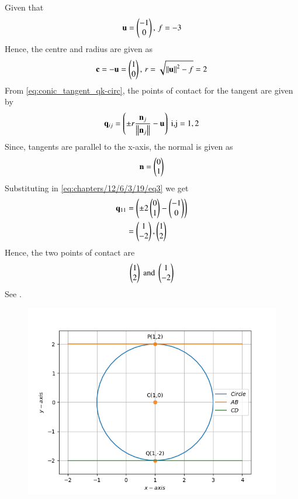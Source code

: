 Given that 
\begin{align}
	\mathbf{u} = \begin{pmatrix}-1\\0\end{pmatrix},\,
	f = -3
\end{align}
Hence, the centre and radius are given as
\begin{align}
	\mathbf{c} = -\mathbf{u} = \begin{pmatrix}1\\0\end{pmatrix},\,
	r = \sqrt{\left\lVert\mathbf{u}\right\rVert^2 - f}
	  = 2
\end{align}
From \eqref{eq:conic_tangent_qk-circ},
the points of contact for the tangent are given by
\begin{align}
	\label{eq:chapters/12/6/3/19/eq3}
	\mathbf{q}_{ij} = \left(\pm r\frac{\mathbf{n}_j}{\left\lVert\mathbf{n}_j\right\rVert}-\mathbf{u}\right) \text{ i,j} = 1,2
\end{align}
Since, tangents are parallel to the x-axis, the normal is given as
\begin{align}
	\mathbf{n} = \begin{pmatrix}0\\1\end{pmatrix}
\end{align}
Substituting in \eqref{eq:chapters/12/6/3/19/eq3} we get
\begin{align}
	\mathbf{q}_{11} &= \left(\pm 2\begin{pmatrix}0\\1\end{pmatrix} - \begin{pmatrix}-1\\0\end{pmatrix}\right)\\
	&= \begin{pmatrix}1\\-2\end{pmatrix},\begin{pmatrix}1\\2\end{pmatrix}
\end{align}
Hence, the two points of contact are
\begin{align}
	\begin{pmatrix}1\\2\end{pmatrix} \text{ and } \begin{pmatrix}1\\-2\end{pmatrix}
\end{align}
See .
\begin{figure}[!h]
	\begin{center} 
	    \includegraphics[width=\columnwidth]{chapters/12/6/3/19/figs/tan1}
	\end{center}
\caption{}
\label{fig:chapters/12/6/3/19/Fig1}
\end{figure}





















